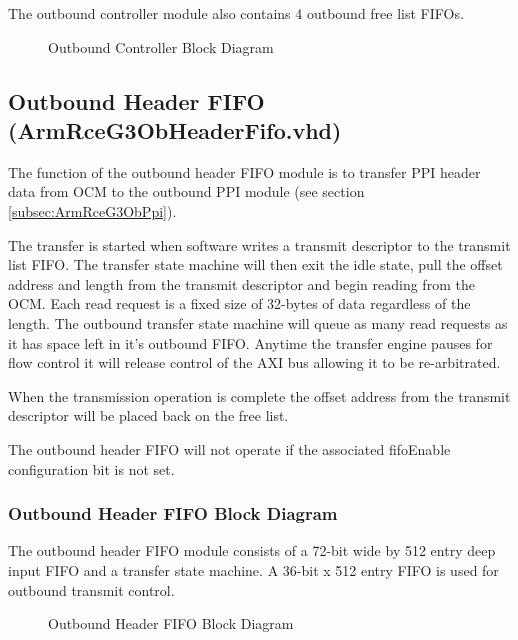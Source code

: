 \documentclass[11pt]{article}
\begin{document}
The outbound controller module also contains 4 outbound free list FIFOs.

\begin{figure}[H]
   \centering
   \caption{Outbound Controller Block Diagram}
   \label{fig:ob_cntrl_block}
\end{figure}

\subsection{Outbound Header FIFO (ArmRceG3ObHeaderFifo.vhd)}
\label{subsec:ArmRceG3ObHeaderFifo}

The function of the outbound header FIFO module is to transfer PPI header data from OCM to the outbound PPI
module (see section \ref{subsec:ArmRceG3ObPpi}).

The transfer is started when software writes a transmit descriptor to the transmit list FIFO. The transfer state
machine will then exit the idle state, pull the offset address and length from the transmit descriptor and begin reading
from the OCM. Each read request is a fixed size of 32-bytes of data regardless of the length. The outbound 
transfer state machine will queue as many read requests as it has space left in it's outbound FIFO. Anytime the
transfer engine pauses for flow control it will release control of the AXI bus allowing it to be re-arbitrated. 

When the transmission operation is complete the offset address from the transmit descriptor will be placed back
on the free list.

The outbound header FIFO will not operate if the associated fifoEnable configuration bit is not set.

\subsubsection{Outbound Header FIFO Block Diagram}

The outbound header FIFO module consists of a 72-bit wide by 512 entry deep input FIFO and a transfer state machine. A 36-bit x 512 entry FIFO is used
for outbound transmit control.

\begin{figure}[H]
   \centering
   \caption{Outbound Header FIFO Block Diagram}
   \label{fig:ob_head_block}
\end{figure}
\end{document}
